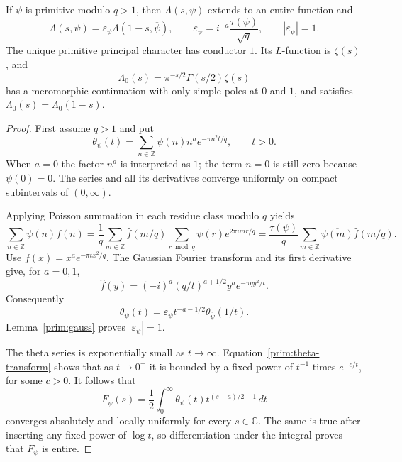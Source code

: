 \begin{proposition}\label{prim:functional-equation}
If $\psi$ is primitive modulo $q>1$, then $\Lambda(s,\psi)$ extends to an
entire function and
\[
 \Lambda(s,\psi)
    =\varepsilon_\psi\Lambda(1-s,\overline\psi),
 \qquad
 \varepsilon_\psi=i^{-a}\frac{\tau(\psi)}{\sqrt q},
 \qquad |\varepsilon_\psi|=1.
\]
The unique primitive principal character has conductor $1$.  Its
$L$-function is $\zeta(s)$, and
\[
 \Lambda_0(s)=\pi^{-s/2}\Gamma(s/2)\zeta(s)
\]
has a meromorphic continuation with only simple poles at $0$ and $1$,
and satisfies $\Lambda_0(s)=\Lambda_0(1-s)$.
\end{proposition}

\begin{proof}
First assume $q>1$ and put
\[
 \theta_\psi(t)=\sum_{n\in\mathbb Z}
      \psi(n)n^a e^{-\pi n^2t/q},\qquad t>0.
\]
When $a=0$ the factor $n^a$ is interpreted as $1$; the term $n=0$ is
still zero because $\psi(0)=0$.  The series and all its derivatives
converge uniformly on compact subintervals of $(0,\infty)$.

Applying Poisson summation in each residue class modulo $q$ yields
\[
 \sum_{n\in\mathbb Z}\psi(n)f(n)
   =\frac1q\sum_{m\in\mathbb Z}\widehat f(m/q)
       \sum_{r\bmod q}\psi(r)e^{2\pi i mr/q}
   =\frac{\tau(\psi)}q\sum_{m\in\mathbb Z}
       \overline{\psi(m)}\widehat f(m/q).
\]
Use $f(x)=x^a e^{-\pi tx^2/q}$.  The Gaussian Fourier transform and its
first derivative give, for $a=0,1$,
\[
 \widehat f(y)=(-i)^a
      (q/t)^{a+1/2}y^a e^{-\pi qy^2/t}.
\]
Consequently
\begin{equation}\label{prim:theta-transform}
 \theta_\psi(t)
  =\varepsilon_\psi t^{-a-1/2}
       \theta_{\overline\psi}(1/t).
\end{equation}
Lemma~\ref{prim:gauss} proves $|\varepsilon_\psi|=1$.

The theta series is exponentially small as $t\to\infty$.
Equation~\eqref{prim:theta-transform} shows that as $t\to0^+$ it is
bounded by a fixed power of $t^{-1}$ times $e^{-c/t}$, for some $c>0$.
It follows that
\[
 F_\psi(s)=\frac12\int_0^\infty
           \theta_\psi(t)t^{(s+a)/2-1}\,dt
\]
converges absolutely and locally uniformly for every $s\in\mathbb C$.
The same is true after inserting any fixed power of $\log t$, so
differentiation under the integral proves that $F_\psi$ is entire.


\end{proof}
